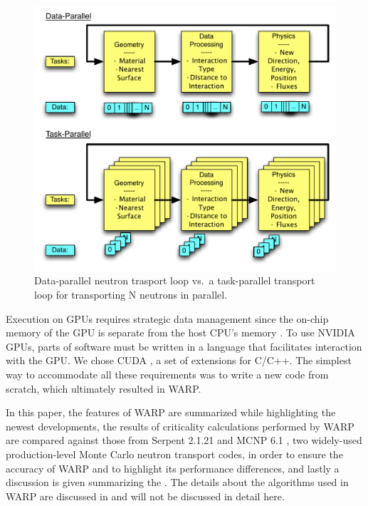 \documentclass[preprint,12pt]{elsarticle}
\begin{document}
\begin{figure}[h!] 
  \centering
    \includegraphics[width=\textwidth]{graphics/datavtask.pdf}
     \caption{Data-parallel neutron trasport loop vs.\ a task-parallel transport loop for transporting N neutrons in parallel.  \label{datavtask} }
\end{figure}

Execution on GPUs requires strategic data management since the on-chip memory of the GPU is separate from the host CPU's memory \cite{cuda}. To use NVIDIA GPUs, parts of software must be written in a language that facilitates interaction with the GPU. We chose CUDA \cite{cuda}, a set of extensions for C/C++.  
The simplest way to accommodate all these requirements was to write a new code from scratch, which ultimately resulted in WARP.  

In this paper, the features of WARP are summarized while highlighting the newest developments, the results of criticality calculations performed by WARP are compared against those from Serpent 2.1.21 \cite{jaakko,serpent} and MCNP 6.1 \cite{mcnp6}, two widely-used production-level Monte Carlo neutron transport codes, in order to ensure the accuracy of WARP and to highlight its performance differences, and lastly a discussion is given summarizing the .  The details about the algorithms used in WARP are discussed in \cite{algorithms} and will not be discussed in detail here.
\end{document}
